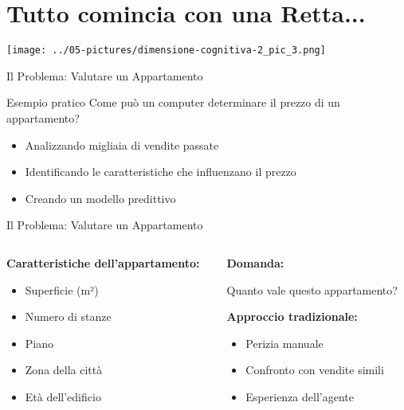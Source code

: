 \documentclass[aspectratio=169]{beamer}
\begin{document}
\section{Tutto comincia con una Retta...}
%
%
\begin{frame}
    \centering
    \texttt{[image: ../05-pictures/dimensione-cognitiva-2\_pic\_3.png]}
\end{frame}
%
%
\begin{frame}{Il Problema: Valutare un Appartamento}
\begin{block}{Esempio pratico}
Come può un computer determinare il prezzo di un appartamento?
\begin{itemize}
    \item Analizzando migliaia di vendite passate
    \item Identificando le caratteristiche che influenzano il prezzo
    \item Creando un modello predittivo
\end{itemize}
\end{block}
\end{frame}
%
%
\begin{frame}{Il Problema: Valutare un Appartamento}
\begin{columns}
\begin{column}{0.5\textwidth}
\textbf{Caratteristiche dell'appartamento:}
\begin{itemize}
    \item Superficie (m²)
    \item Numero di stanze
    \item Piano
    \item Zona della città
    \item Età dell'edificio
\end{itemize}
\end{column}
\begin{column}{0.5\textwidth}
\textbf{Domanda:}
\begin{center}
\Large
Quanto vale questo appartamento?
\end{center}

\vspace{0.5cm}

\textbf{Approccio tradizionale:}
\begin{itemize}
    \item Perizia manuale
    \item Confronto con vendite simili
    \item Esperienza dell'agente
\end{itemize}
\end{column}
\end{columns}
\end{frame}%
\end{document}
